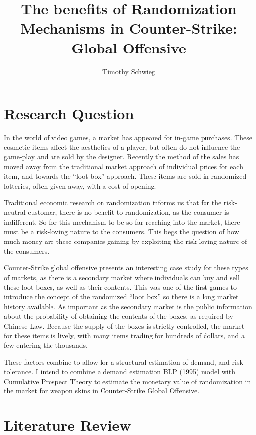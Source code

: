 \documentclass[12pt]{paper}
\title{The benefits of Randomization Mechanisms in Counter-Strike:
  Global Offensive}
\author{Timothy Schwieg}
\begin{document}
\maketitle

\section{Research Question}


In the world of video games, a market has appeared for in-game
purchases. These cosmetic items affect the aesthetics of a player, but
often do not influence the game-play and are sold by the
designer. Recently the method of the sales has moved away from the
traditional market approach of individual prices for each item, and
towards the ``loot box'' approach. These items are sold in randomized
lotteries, often given away, with a cost of opening.

Traditional economic research on randomization informs us that for the
risk-neutral customer, there is no benefit to randomization, as the
consumer is indifferent. So for this mechanism to be so far-reaching
into the market, there must be a risk-loving nature to the
consumers. This begs the question of how much money are these
companies gaining by exploiting the risk-loving nature of the
consumers.

Counter-Strike global offensive presents an interesting case study for
these types of markets, as there is a secondary market where
individuals can buy and sell these loot boxes, as well as their
contents. This was one of the first games to introduce the concept of
the randomized ``loot box'' so there is a long market history
available. As important as the secondary market is the public
information about the probability of obtaining the contents of the
boxes, as required by Chinese Law. Because the supply of the boxes is
strictly controlled, the market for these items is lively, with many
items trading for hundreds of dollars, and a few entering the thousands.


These factors combine to allow for a structural estimation of demand,
and risk-tolerance. I intend to combine a demand estimation BLP (1995)
model with Cumulative Prospect Theory to estimate the monetary value
of randomization in the market for weapon skins in Counter-Strike
Global Offensive.

\section{Literature Review}
\end{document}
